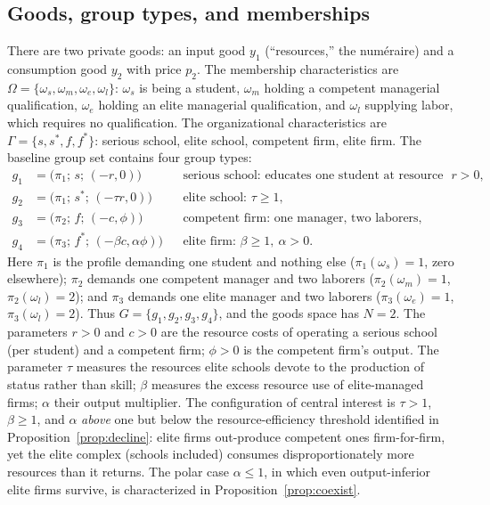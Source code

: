 \documentclass[12pt,letterpaper]{article}
\theoremstyle{definition}
\begin{document}
\subsection{Goods, group types, and memberships}

There are two private goods: an input good $y_1$ (``resources,'' the num\'{e}raire) and a consumption good $y_2$ with price $p_2$.
The membership characteristics are $\Omega=\{\omega_s,\omega_m,\omega_e,\omega_l\}$: $\omega_s$ is being a student, $\omega_m$ holding a competent managerial qualification, $\omega_e$ holding an elite managerial qualification, and $\omega_l$ supplying labor, which requires no qualification.
The organizational characteristics are $\Gamma=\{s,s^\ast,f,f^\ast\}$: serious school, elite school, competent firm, elite firm.
The baseline group set contains four group types:
\begin{align*}
  g_1 &= \big(\pi_1;\, s;\, (-r,0)\big)
    && \text{serious school: educates one student at resource cost } r>0,\\
  g_2 &= \big(\pi_1;\, s^\ast;\, (-\tau r,0)\big)
    && \text{elite school: } \tau\geq 1,\\
  g_3 &= \big(\pi_2;\, f;\, (-c,\phi)\big)
    && \text{competent firm: one manager, two laborers},\\
  g_4 &= \big(\pi_3;\, f^\ast;\, (-\beta c,\alpha\phi)\big)
    && \text{elite firm: } \beta\geq 1,\ \alpha>0.
\end{align*}
Here $\pi_1$ is the profile demanding one student and nothing else ($\pi_1(\omega_s)=1$, zero elsewhere); $\pi_2$ demands one competent manager and two laborers ($\pi_2(\omega_m)=1$, $\pi_2(\omega_l)=2$); and $\pi_3$ demands one elite manager and two laborers ($\pi_3(\omega_e)=1$, $\pi_3(\omega_l)=2$).
Thus $G=\{g_1,g_2,g_3,g_4\}$, and the goods space has $N=2$.
The parameters $r>0$ and $c>0$ are the resource costs of operating a serious school (per student) and a competent firm; $\phi>0$ is the competent firm's output.
The parameter $\tau$ measures the resources elite schools devote to the production of status rather than skill; $\beta$ measures the excess resource use of elite-managed firms; $\alpha$ their output multiplier.
The configuration of central interest is $\tau>1$, $\beta\geq 1$, and $\alpha$ \emph{above} one but below the resource-efficiency threshold identified in Proposition~\ref{prop:decline}: elite firms out-produce competent ones firm-for-firm, yet the elite complex (schools included) consumes disproportionately more resources than it returns.
The polar case $\alpha\leq 1$, in which even output-inferior elite firms survive, is characterized in Proposition~\ref{prop:coexist}.
\end{document}
